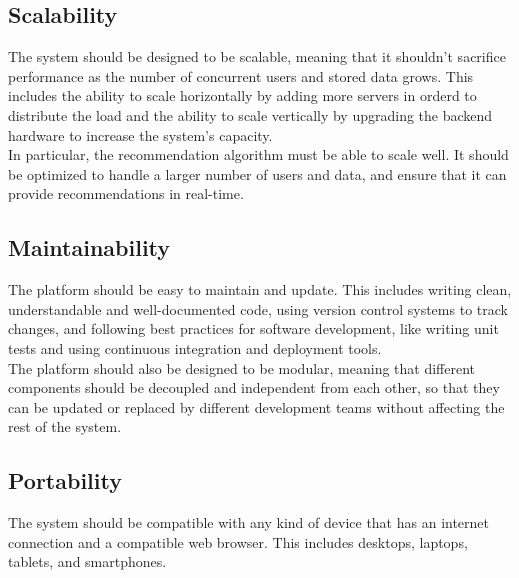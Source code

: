 \subsection{Scalability}
The system should be designed to be scalable, meaning that it shouldn't sacrifice performance as the number of concurrent users and stored data grows.
This includes the ability to scale horizontally by adding more servers in orderd to distribute the load and the ability to scale vertically by upgrading 
the backend hardware to increase the system's capacity. \\
In particular, the recommendation algorithm must be able to scale well. It should be optimized to handle a larger number of users and data, and ensure
that it can provide recommendations in real-time.

\subsection{Maintainability}
The platform should be easy to maintain and update. This includes writing clean, understandable and well-documented code, using version control systems 
to track changes, and following best practices for software development, like writing unit tests and using continuous integration and deployment tools. \\
The platform should also be designed to be modular, meaning that different components should be decoupled and independent from each other, so that
they can be updated or replaced by different development teams without affecting the rest of the system.

\subsection{Portability}
The system should be compatible with any kind of device that has an internet connection and a compatible web browser. This includes desktops, laptops,
tablets, and smartphones.